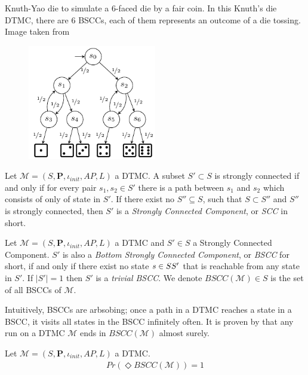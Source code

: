 \begin{example}
    Knuth-Yao die to simulate a 6-faced die by a fair coin. In this Knuth's die DTMC, there are 6
    BSCCs, each of them represents an outcome of a die tossing. Image taken from
    \cite{katoen2016probabilistic}
    \begin{figure}[H]
        \centering
        \includegraphics[width=0.5\textwidth]{figures/knuth_die.png}
        \label{fig:knuth-die}
    \end{figure}
\end{example}

\begin{definition}
    Let $\mathcal{M}=(S,\mathbf{P}, \iota_{init}, AP,L)$ a DTMC. A subset $S'\subset S$ is strongly
    connected if and only if for every pair $s_1,s_2\in S'$ there is a path between $s_1$ and $s_2$
    which consists of only of state in $S'$. If there exist no $S''\subseteq S$, such that $S\subset
        S''$ and $S''$ is strongly connected, then $S'$ is a \textit{Strongly Connected Component}, or
    \textit{SCC} in short.
\end{definition}

\begin{definition}
    Let $\mathcal{M}=(S,\mathbf{P}, \iota_{init}, AP,L)$ a DTMC and $S'\in S$ a Strongly Connected
    Component. $S'$ is also a \textit{Bottom Strongly Connected Component}, or \textit{BSCC} for
    short, if and only if there exist no state $s \in S\\S'$ that is reachable from any state in
    $S'$. If $|S'|=1$ then $S'$ is a \textit{trivial BSCC}. We denote $BSCC(\mathcal{M})\in S$ is
    the set of all BSCCs of $\mathcal{M}$.
\end{definition}
Intuitively, BSCCs are arbsobing; once a path in a DTMC reaches a state in a BSCC, it visits  all
states in the BSCC infinitely often. It is proven by \cite{baier2008principles} that any run on a
DTMC $\mathcal{M}$ ends in $BSCC(\mathcal{M})$ almost surely.
\begin{theorem}
    Let $\mathcal{M}=(S,\mathbf{P}, \iota_{init}, AP,L)$ a DTMC.
    \begin{align*}
        Pr(\Diamond BSCC(\mathcal{M})) = 1
    \end{align*}
\end{theorem}

